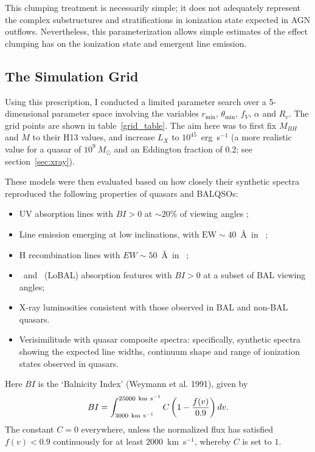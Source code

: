 This clumping treatment is necessarily simple; it does not adequately
represent the complex substructures and stratifications in ionization
state expected in AGN outflows. 
Nevertheless, this parameterization 
allows simple estimates of the effect clumping has on the ionization 
state and emergent line emission.


\subsection{The Simulation Grid}
\label{sec:sim_grid}
Using this prescription, I conducted a limited parameter
search over a 5-dimensional parameter space involving the 
variables $r_{\mathrm{min}}$, $\theta_{\mathrm{min}}$, $f_V$, $\alpha$ and $R_v$.
The grid points are shown in table~\ref{grid_table}.
The aim here was to first fix $M_{BH}$ and $\dot{M}$ to their H13 values,
and increase $L_X$ to $10^{45}$~erg~s$^{-1}$ (a more realistic value for a 
quasar of $10^9~M_\odot$ and an Eddington fraction of $0.2$; see section~\ref{sec:xray}).

These models were then evaluated based on 
how closely their synthetic spectra reproduced the 
following properties of quasars and BALQSOs:

\begin{itemize}
\item UV absorption lines 
with $BI > 0$ at $\sim20\%$ of viewing angles \cite[e.g.][]{knigge2008};
\item Line emission emerging at low inclinations, with $\mathrm{EW}\sim40$~\AA\ in \civline\ \citep[e.g. ][]{shen2011};
\item H recombination lines with $EW\sim50$~\AA\ in \la\ \citep[e.g.][]{shen2011};
\item \mg\ and \al\ (LoBAL) absorption features with $BI > 0$ at a subset of 
BAL viewing angles;
\item X-ray luminosities consistent with those observed in BAL and non-BAL
quasars.
\item Verisimilitude with quasar composite spectra: specifically, synthetic spectra showing
the expected line widths, continuum shape and range of ionization states observed
in quasars.
\end{itemize}
Here $BI$ is the `Balnicity Index' (Weymann et al. 1991), given by
\begin{equation}
BI = \int^{25000~{\rm km~s}^{-1}}_{3000~{\rm km~s}^{-1}} C \left( 1 - \frac{f(v)}{0.9} \right) dv.
\end{equation}
The constant $C=0$ everywhere, unless the normalized flux
has satisfied $f(v)<0.9$ continuously for at least $2000$~km~s$^{−1}$, 
whereby $C$ is set to $1$.

